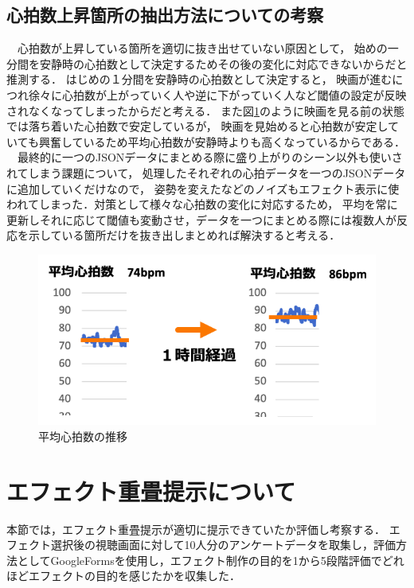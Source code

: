 \subsection{心拍数上昇箇所の抽出方法についての考察}
　心拍数が上昇している箇所を適切に抜き出せていない原因として，
始めの一分間を安静時の心拍数として決定するためその後の変化に対応できないからだと推測する．
はじめの１分間を安静時の心拍数として決定すると，
映画が進むにつれ徐々に心拍数が上がっていく人や逆に下がっていく人など閾値の設定が反映されなくなってしまったからだと考える．
また図\ref{kekka2}のように映画を見る前の状態では落ち着いた心拍数で安定しているが，
映画を見始めると心拍数が安定していても興奮しているため平均心拍数が安静時よりも高くなっているからである．
　最終的に一つのJSONデータにまとめる際に盛り上がりのシーン以外も使いされてしまう課題について，
処理したそれぞれの心拍データを一つのJSONデータに追加していくだけなので，
姿勢を変えたなどのノイズもエフェクト表示に使われてしまった．対策として様々な心拍数の変化に対応するため，
平均を常に更新しそれに応じて閾値も変動させ，データを一つにまとめる際には複数人が反応を示している箇所だけを抜き出しまとめれば解決すると考える． 

\begin{figure}[H]
    \centering
    \includegraphics[width=13cm]{images/chapter4/bpmave.png}
    \caption{平均心拍数の推移}
    \label{kekka2}
\end{figure}

\section{エフェクト重畳提示について}
本節では，エフェクト重畳提示が適切に提示できていたか評価し考察する．
エフェクト選択後の視聴画面に対して10人分のアンケートデータを取集し，評価方法としてGoogleFormsを使用し，エフェクト制作の目的を1から5段階評価でどれほどエフェクトの目的を感じたかを収集した．


